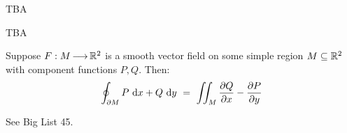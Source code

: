 \begin{pf}[title=Locally Simple]
    TBA
\end{pf}

\begin{pf}[title=Finale]
    TBA
\end{pf}

\newpage
\begin{thm}[num=10.3,title=Green's Theorem]
    Suppose $ F: M \operatorname{\longrightarrow} \mathbb{R}^{2} $ is a smooth vector field on some simple
    region $ M \subseteq \mathbb{R}^{2} $ with component functions $ P, Q $. Then:
    \begin{equation*}
        \oint_{\partial M}P\textrm{ d} x + Q\textrm{ d} y \ = \
        \iint_{M}\frac{\partial Q}{\partial x}-\frac{\partial P}{\partial y}
    \end{equation*}
\end{thm}

\begin{pf}
    See Big List 45.
\end{pf}
